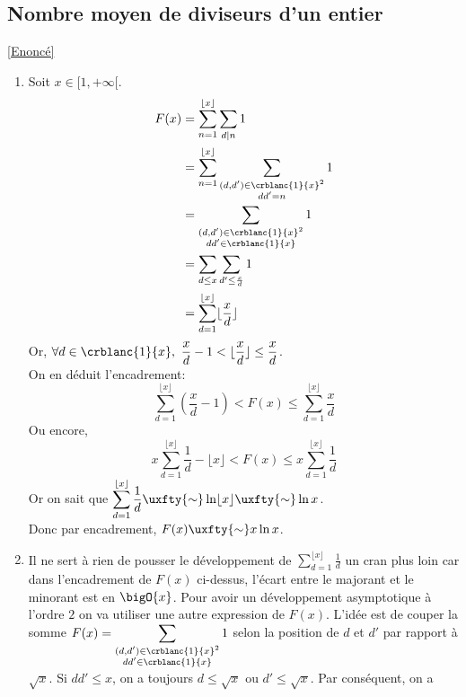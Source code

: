 \documentclass{book}
\begin{document}
	\subsection{Nombre moyen de diviseurs d'un entier }
	\label{sec:nombre-moyen-de-diviseurs-dun-entier-etoile4}
	\textcolor{blue}{\hyperref[Nombre moyen de diviseurs d'un entier]{[Enoncé]}}\\
	\begin{enumerate}
		\item Soit $x\in [1,+\infty[$.
		\begin{align*}
			F(x)&=\displaystyle\sum_{n=1}^{\lfloor x\rfloor}\sum\limits_{d|n}1\\
			&=\displaystyle\sum_{n=1}^{\lfloor x\rfloor}\sum\limits_{\substack{(d,d')\in \crblanc{1}{x}^2\\dd'=n}}1\\
			&=\displaystyle\sum\limits_{\substack{(d,d')\in \crblanc{1}{x}^2\\dd'\in \crblanc{1}{x}}}1\\
			&=\displaystyle\sum\limits_{d\leq x}\sum\limits_{d'\leq\frac{x}{d}}1\\
			&=\displaystyle\sum_{d=1}^{\lfloor x\rfloor}\lfloor\frac{x}{d}\rfloor
		\end{align*}
		Or, $\forall d\in \crblanc{1}{x},\ \displaystyle\frac{x}{d}-1<\lfloor\frac{x}{d}\rfloor\leq\frac{x}{d}$.\\
		On en déduit l'encadrement:
		$$\displaystyle\sum\limits_{d=1}^{\lfloor x\rfloor}\left(\frac{x}{d}-1\right)<F(x)\leq \sum\limits_{d=1}^{\lfloor x\rfloor}\frac{x}{d}$$
		Ou encore,
		$$x\sum\limits_{d=1}^{\lfloor x\rfloor}\frac{1}{d}-\lfloor x\rfloor<F(x)\leq x\sum\limits_{d=1}^{\lfloor x\rfloor}\frac{1}{d}$$
		Or on sait que $\displaystyle\sum\limits_{d=1}^{\lfloor x\rfloor}\frac{1}{d}\uxfty{\sim}\ln\lfloor x\rfloor\uxfty{\sim}\ln x$.\\
		Donc par encadrement, $F(x)\uxfty{\sim}x\ln x$.
		\item Il ne sert à rien de pousser le développement de $\displaystyle\sum\limits_{d=1}^{\lfloor x\rfloor}\frac{1}{d}$ un cran plus loin car dans l'encadrement de $F(x)$ ci-dessus, l'écart entre le majorant et le minorant est en $\bigO{x}$. Pour avoir un développement asymptotique à l'ordre $2$ on va utiliser une autre expression de $F(x)$. L'idée est de couper la somme $F(x)=\displaystyle\sum\limits_{\substack{(d,d')\in \crblanc{1}{x}^2\\dd'\in \crblanc{1}{x}}}1$ selon la position de $d$ et $d'$ par rapport à $\displaystyle\sqrt x$. Si $dd'\leq x$, on a toujours $d\leq \displaystyle\sqrt x$ ou $d'\leq \displaystyle\sqrt x$. Par conséquent, on a

\end{enumerate}
\end{document}
